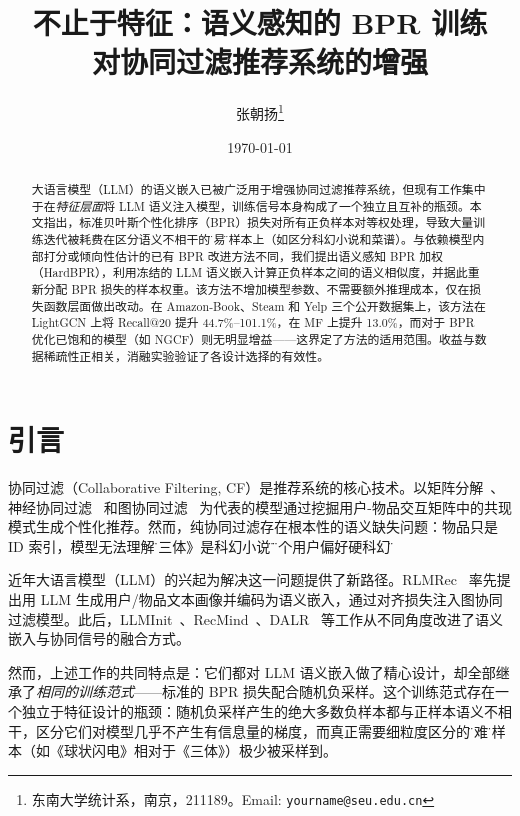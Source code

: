 \documentclass[11pt,a4paper]{article}
\title{\bfseries 不止于特征：语义感知的 BPR 训练\\对协同过滤推荐系统的增强}
\author{张朝扬\thanks{东南大学统计系，南京，211189。Email: \texttt{yourname@seu.edu.cn}}}
\date{\today}
\begin{document}
\maketitle

\begin{abstract}
大语言模型（LLM）的语义嵌入已被广泛用于增强协同过滤推荐系统，但现有工作集中于在\emph{特征层面}将 LLM 语义注入模型，训练信号本身构成了一个独立且互补的瓶颈。本文指出，标准贝叶斯个性化排序（BPR）损失对所有正负样本对等权处理，导致大量训练迭代被耗费在区分语义不相干的\"容易\"负样本上（如区分科幻小说和菜谱）。与依赖模型内部打分或倾向性估计的已有 BPR 改进方法不同，我们提出语义感知 BPR 加权（HardBPR），利用冻结的 LLM 语义嵌入计算正负样本之间的语义相似度，并据此重新分配 BPR 损失的样本权重。该方法不增加模型参数、不需要额外推理成本，仅在损失函数层面做出改动。在 Amazon-Book、Steam 和 Yelp 三个公开数据集上，该方法在 LightGCN 上将 Recall@20 提升 44.7\%--101.1\%，在 MF 上提升 13.0\%，而对于 BPR 优化已饱和的模型（如 NGCF）则无明显增益——这界定了方法的适用范围。收益与数据稀疏性正相关，消融实验验证了各设计选择的有效性。
\end{abstract}

\section{引言}

协同过滤（Collaborative Filtering, CF）是推荐系统的核心技术。以矩阵分解~\cite{Koren2009}、神经协同过滤~\cite{He2017NCF} 和图协同过滤~\cite{He2020LightGCN} 为代表的模型通过挖掘用户-物品交互矩阵中的共现模式生成个性化推荐。然而，纯协同过滤存在根本性的语义缺失问题：物品只是 ID 索引，模型无法理解\"《三体》是科幻小说\"或\"这个用户偏好硬科幻\"。

近年大语言模型（LLM）的兴起为解决这一问题提供了新路径。RLMRec~\cite{Ren2024RLMRec} 率先提出用 LLM 生成用户/物品文本画像并编码为语义嵌入，通过对齐损失注入图协同过滤模型。此后，LLMInit~\cite{Zhang2025LLMInit}、RecMind~\cite{Xue2026RecMind}、DALR~\cite{Peng2024DALR} 等工作从不同角度改进了语义嵌入与协同信号的融合方式。

然而，上述工作的共同特点是：它们都对 LLM 语义嵌入做了精心设计，却全部继承了\emph{相同的训练范式}——标准的 BPR 损失配合随机负采样。这个训练范式存在一个独立于特征设计的瓶颈：随机负采样产生的绝大多数负样本都与正样本语义不相干，区分它们对模型几乎不产生有信息量的梯度，而真正需要细粒度区分的\"困难\"负样本（如《球状闪电》相对于《三体》）极少被采样到。
\end{document}
